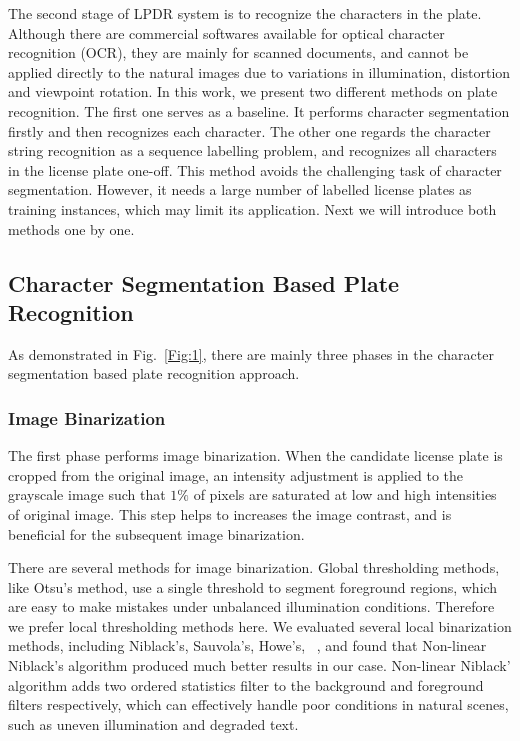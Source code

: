 \documentclass[twocolumn]{svjour3}
\begin{document}
The second stage of LPDR system is to recognize the characters in the plate. Although there are commercial softwares available for optical character recognition (OCR), they are mainly for scanned documents, and cannot be applied directly to the natural images due to variations in illumination, distortion and viewpoint rotation. In this work, we present two different methods on plate recognition. The first one serves as a baseline. It performs character segmentation firstly and then recognizes each character.  The other one regards the character string recognition as a sequence labelling problem, and recognizes all characters in the license plate one-off.  This method avoids the challenging task of character segmentation. However, it needs a large number of labelled license plates as training instances, which may limit its application. Next we will introduce both methods one by one.

\subsection{Character Segmentation Based Plate Recognition}\label{sec:Segmentation}
As demonstrated  in Fig.~\ref{Fig:1}, there are mainly three phases in the character segmentation based plate recognition approach.

\subsubsection{Image Binarization}
The first phase performs image binarization. When the candidate license plate is cropped from the original image, an intensity adjustment is applied to the grayscale image such that $1\%$ of pixels are saturated at low and high intensities of original image. This step helps to increases the image contrast, and is beneficial for the subsequent image binarization. %

There are several methods for image binarization. Global thresholding methods, like Otsu's method, use a single threshold to segment foreground regions, which are easy to make mistakes under unbalanced illumination conditions. Therefore we prefer local thresholding methods here. We evaluated several local binarization methods, including Niblack's, Sauvola's, Howe's, \etc~\cite{Milyaev2015}, and found that Non-linear Niblack's algorithm produced much better results in our case. Non-linear Niblack' algorithm adds two ordered statistics filter to the background and foreground filters respectively, which can effectively handle poor conditions in natural scenes, such as uneven illumination and degraded text. %
\end{document}
